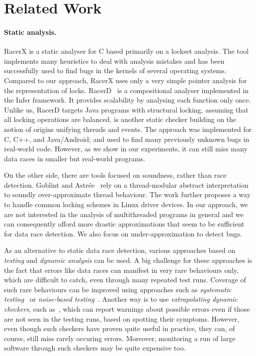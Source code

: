 \section{Related Work}
\vspace*{-1mm}

\paragraph{Static analysis.} RacerX \cite{racerx} is a static analyser for C
based primarily on a lockset analysis. The tool implements many heuristics to
deal with analysis mistakes and has been successfully used to find bugs in the
kernels of several operating systems. Compared to our approach, RacerX uses only
a very simple pointer analysis for the representation of locks.
RacerD~\cite{racerd} is a compositional analyser implemented in the Infer
framework. It provides scalability by analysing each function only once. Unlike
us, RacerD targets Java programs with structural locking, assuming that all
locking operations are balanced. \otwo \cite{o2} is another static checker
building on the notion of origins unifying threads and events. The approach was
implemented for C, C++, and Java/Android; and used to find many previously
unknown bugs in real-world code. However, as we show in our experiments, it can
still miss many data races in smaller but real-world programs.

On the other side, there are tools focused on soundness, rather than race
detection. Goblint \cite{goblint} and Astrée~\cite{astree2,astree1} rely on a
thread-modular abstract interpretation to soundly over-approximate thread
behaviour. The work \cite{goblint} further proposes a way to handle common
locking schemes in Linux driver devices. In our approach, we are not interested
in the analysis of multithreaded programs in general and we can consequently
afford more drastic approximations that seem to be sufficient for data race
detection.  We also focus on under-approximation to detect bugs.

As an alternative to static data race detection, various approaches based on
\emph{testing} and \emph{dynamic analysis} can be used. A big challenge for
these approaches is the fact that errors like data races can manifest in very
rare behaviours only, which are difficult to catch, even through many repeated
test runs. Coverage of such rare behaviours can be improved using approaches
such as \emph{systematic testing}~\cite{schedspec12} or \emph{noise-based
testing}~\cite{contestframework03,noise15}. Another way is to use
\emph{extrapolating dynamic checkers}, such
as~\cite{Eraser,goldilocks07,fasttrack09}, which can report warnings about
possible errors even if those are not seen in the testing runs, based on
spotting their symptoms. However, even though such checkers have proven quite
useful in practice, they can, of course, still miss rarely occuring errors.
Moreover, monitoring a run of large software through such checkers may be quite
expensive too. 

